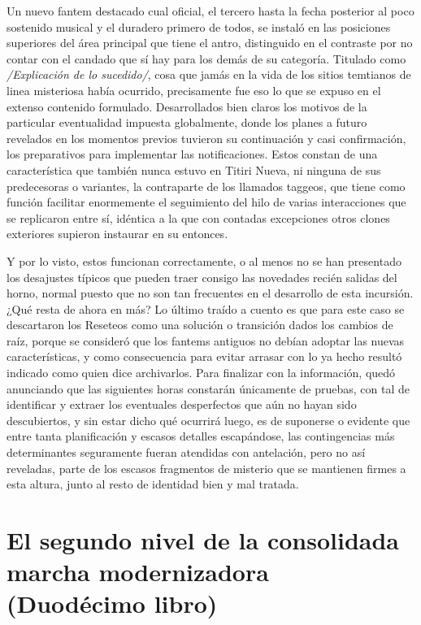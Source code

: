 \documentclass[
]{book}
\begin{document}
Un nuevo fantem destacado cual oficial, el tercero hasta la fecha posterior al poco sostenido musical y el duradero primero de todos, se instaló en las posiciones superiores del área principal que tiene el antro, distinguido en el contraste por no contar con el candado que sí hay para los demás de su categoría. Titulado como \emph{/Explicación de lo sucedido/}, cosa que jamás en la vida de los sitios temtianos de linea misteriosa había ocurrido, precisamente fue eso lo que se expuso en el extenso contenido formulado. Desarrollados bien claros los motivos de la particular eventualidad impuesta globalmente, donde los planes a futuro revelados en los momentos previos tuvieron su continuación y casi confirmación, los preparativos para implementar las notificaciones. Estos constan de una característica que también nunca estuvo en Titiri Nueva, ni ninguna de sus predecesoras o variantes, la contraparte de los llamados taggeos, que tiene como función facilitar enormemente el seguimiento del hilo de varias interacciones que se replicaron entre sí, idéntica a la que con contadas excepciones otros clones exteriores supieron instaurar en su entonces.

Y por lo visto, estos funcionan correctamente, o al menos no se han presentado los desajustes típicos que pueden traer consigo las novedades recién salidas del horno, normal puesto que no son tan frecuentes en el desarrollo de esta incursión. ¿Qué resta de ahora en más? Lo último traído a cuento es que para este caso se descartaron los Reseteos como una solución o transición dados los cambios de raíz, porque se consideró que los fantems antiguos no debían adoptar las nuevas características, y como consecuencia para evitar arrasar con lo ya hecho resultó indicado como quien dice archivarlos. Para finalizar con la información, quedó anunciando que las siguientes horas constarán únicamente de pruebas, con tal de identificar y extraer los eventuales desperfectos que aún no hayan sido descubiertos, y sin estar dicho qué ocurrirá luego, es de suponerse o evidente que entre tanta planificación y escasos detalles escapándose, las contingencias más determinantes seguramente fueran atendidas con antelación, pero no así reveladas, parte de los escasos fragmentos de misterio que se mantienen firmes a esta altura, junto al resto de identidad bien y mal tratada.

\hypertarget{el-segundo-nivel-de-la-consolidada-marcha-modernizadora-duoduxe9cimo-libro}{%
\chapter{El segundo nivel de la consolidada marcha modernizadora (Duodécimo libro)}\label{el-segundo-nivel-de-la-consolidada-marcha-modernizadora-duoduxe9cimo-libro}}
\end{document}
